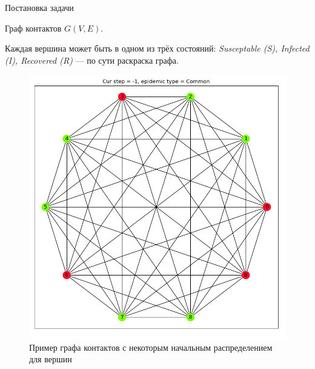 	\begin{frame}{Постановка задачи}
		
		Граф контактов $G(V,E)$. 
		
		Каждая вершина может быть в одном из трёх состояний:\textit{ Susceptable (S), Infected (I), Recovered (R)} --- по сути раскраска графа.
		
		\begin{center}
			\begin{figure}
				\includegraphics[width=0.5\linewidth]{../../figs/anti_evdence_1/init_config}
				\caption{Пример графа контактов с некоторым начальным распределением для вершин}
			\end{figure}
		\end{center}
		 
	\end{frame}

